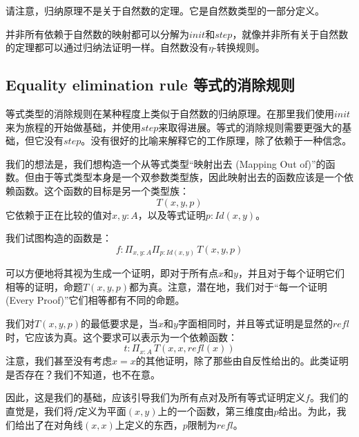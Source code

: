 \documentclass[DaoFP]{subfiles}
\begin{document}
 请注意，归纳原理不是关于自然数的定理。它是自然数类型的一部分定义。

 并非所有依赖于自然数的映射都可以分解为$\mathit{init}$和$\mathit{step}$，就像并非所有关于自然数的定理都可以通过归纳法证明一样。自然数没有$\eta$-转换规则。

 \subsection{Equality elimination rule 等式的消除规则}

 等式类型的消除规则在某种程度上类似于自然数的归纳原理。在那里我们使用$\mathit{init}$来为旅程的开始做基础，并使用$\mathit{step}$来取得进展。等式的消除规则需要更强大的基础，但它没有$\mathit{step}$。没有很好的比喻来解释它的工作原理，除了依赖于一种信念。

 我们的想法是，我们想构造一个从等式类型“映射出去 (Mapping Out of)”的函数。但由于等式类型本身是一个双参数类型族，因此映射出去的函数应该是一个依赖函数。这个函数的目标是另一个类型族：
 \[T(x, y, p)\]
 它依赖于正在比较的值对$x, y \colon A$，以及等式证明$p \colon \mathit{Id}(x, y)$。

 我们试图构造的函数是：
 \[ f \colon \Pi_{x, y : A} \Pi_{p : \mathit{Id}(x, y)} \, T(x, y, p) \]

 可以方便地将其视为生成一个证明，即对于所有点$x$和$y$，并且对于每个证明它们相等的证明，命题$T(x, y, p)$都为真。注意，潜在地，我们对于“每一个证明 (Every Proof)”它们相等都有不同的命题。

 我们对$T(x, y, p)$的最低要求是，当$x$和$y$字面相同时，并且等式证明是显然的$\mathit{refl}$时，它应该为真。这个要求可以表示为一个依赖函数：
 \[t \colon \Pi_{x : A} \,T\left(x, x, \mathit{refl}(x)\right)\]
 注意，我们甚至没有考虑$x = x$的其他证明，除了那些由自反性给出的。此类证明是否存在？我们不知道，也不在意。

 因此，这是我们的基础，应该引导我们为所有点对及所有等式证明定义$f$。我们的直觉是，我们将$f$定义为平面$(x, y)$上的一个函数，第三维度由$p$给出。为此，我们给出了在对角线$(x, x)$上定义的东西，$p$限制为$\mathit{refl}$。
\end{document}
